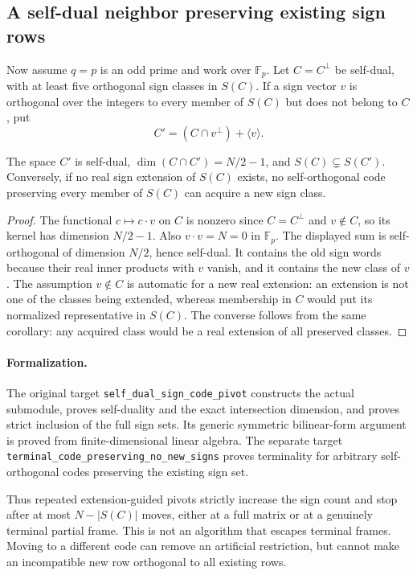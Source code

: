 \subsection{A self-dual neighbor preserving existing sign rows}
Now assume $q=p$ is an odd prime and work over $\mathbb F_p$.
Let $C=C^\perp$ be self-dual, with at least five orthogonal sign
classes in $S(C)$. If a sign vector $v$ is orthogonal over the
integers to every member of $S(C)$ but does not belong to $C$, put
\[
 C'=(C\cap v^\perp)+\langle v\rangle.
\]
\begin{proposition}\label{code:pivot}
The space $C'$ is self-dual, $\dim(C\cap C')=N/2-1$, and
$S(C)\subsetneq S(C')$. Conversely, if no real sign extension of
$S(C)$ exists, no self-orthogonal code preserving every member
of $S(C)$ can acquire a new sign class.
\end{proposition}
\begin{proof}
The functional $c\mapsto c\cdot v$ on $C$ is nonzero since
$C=C^\perp$ and $v\notin C$, so its kernel has dimension $N/2-1$.
Also $v\cdot v=N=0$ in $\mathbb F_p$. The displayed sum is
self-orthogonal of dimension $N/2$, hence self-dual.
It contains the old sign words because their real inner products
with $v$ vanish, and it contains the new class of $v$.
The assumption $v\notin C$ is automatic for a new real extension:
an extension is not one of the classes being extended, whereas
membership in $C$ would put its normalized representative in $S(C)$.
The converse follows from the same corollary: any acquired class
would be a real extension of all preserved classes.
\end{proof}

\paragraph{Formalization.}
The original target
\texttt{self\_\allowbreak dual\_\allowbreak sign\_\allowbreak code\_\allowbreak pivot}
constructs the actual submodule, proves self-duality and the exact
intersection dimension, and proves strict inclusion of the full sign
sets. Its generic symmetric bilinear-form argument is proved from
finite-dimensional linear algebra. The separate target
\texttt{terminal\_\allowbreak code\_\allowbreak preserving\_\allowbreak no\_\allowbreak new\_\allowbreak signs}
proves terminality for arbitrary self-orthogonal codes preserving
the existing sign set.

Thus repeated extension-guided pivots strictly increase the sign
count and stop after at most $N-|S(C)|$ moves, either at a full matrix
or at a genuinely terminal partial frame. This is not an algorithm
that escapes terminal frames. Moving to a different code can remove
an artificial restriction, but cannot make an incompatible new row
orthogonal to all existing rows.

